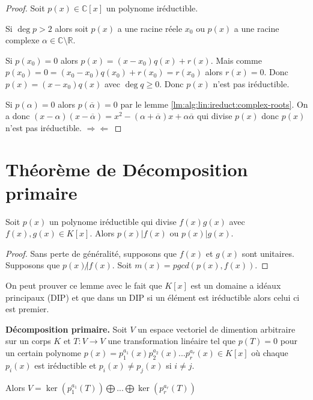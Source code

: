 \begin{proof}
Soit $p(x)\in\mathbb{C}[x]$ un polynome iréductible.

Si $\deg p>2$ alors soit $p(x)$ a une racine réele $x_0$ ou $p(x)$ a une racine complexe $\alpha\in\mathbb{C}\setminus\mathbb{R}$.

Si $p(x_0)=0$ alors $p(x)=(x-x_0)q(x)+r(x)$. Mais comme $p(x_0)=0=(x_0-x_0)q(x_0)+r(x_0)=r(x_0)$ alors $r(x)=0$. Donc $p(x)=(x-x_0)q(x)$ avec $\deg q\geq0$. Donc $p(x)$ n'est pas iréductible.

Si $p(\alpha)=0$ alors $p(\overline{\alpha})=0$ par le lemme \ref{lm:alg:lin:ireduct:complex-roots}. On a donc $(x-\alpha)(x-\overline{\alpha})=x^2-(\alpha+\overline{\alpha})x+\alpha\overline{\alpha}$ qui divise $p(x)$ donc $p(x)$ n'est pas iréductible. $\Longrightarrow\Longleftarrow$
\end{proof}


\section{Théorème de Décomposition primaire}
\label{sec:alg:lin:dec-primaire}

\begin{lm}
\label{lm:alg:lin:dec-primaire:lema-1}
Soit $p(x)$ un polynome iréductible qui divise $f(x)g(x)$ avec $f(x),g(x)\in K[x]$. Alors $p(x)|f(x)$ ou $p(x)|g(x)$.
\end{lm}
\begin{proof}
Sans perte de généralité, supposons que $f(x)$ et $g(x)$ sont unitaires. Supposons que $p(x)\not|f(x)$. Soit $m(x)=pgcd(p(x),f(x))$.
\end{proof}
\begin{rmrk}
On peut prouver ce lemme avec le fait que $K[x]$ est un domaine a idéaux principaux (DIP) et que dans un DIP si un élément est iréductible alors celui ci est premier.
\end{rmrk}

\begin{thm}\textbf{Décomposition primaire.}
\label{th:alg:lin:dec-primaire:dec-primaire}
Soit $V$ un espace vectoriel de dimention arbitraire sur un corps $K$ et $T:V\longrightarrow V$ une transformation linéaire tel que $p(T)=0$ pour un certain polynome $p(x)=p_1^{a_1}(x)p_2^{a_2}(x)...p_r^{a_r}(x)\in K[x]$ où chaque $p_i(x)$ est iréductible et $p_i(x)\neq p_j(x)$ si $i\neq j$.

Alors $V=\ker\left(p_1^{a_1}(T)\right)\bigoplus...\bigoplus\ker\left(p_r^{a_r}(T)\right)$
\end{thm}